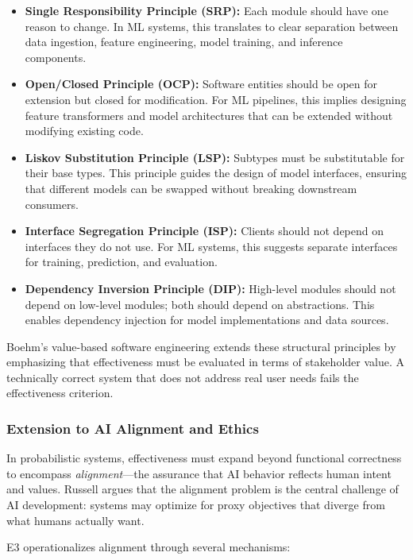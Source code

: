 \documentclass[11pt,a4paper]{article}
\begin{document}
\begin{itemize}[leftmargin=2em]
    \item \textbf{Single Responsibility Principle (SRP):} Each module should have one reason to change. In ML systems, this translates to clear separation between data ingestion, feature engineering, model training, and inference components.
    \item \textbf{Open/Closed Principle (OCP):} Software entities should be open for extension but closed for modification. For ML pipelines, this implies designing feature transformers and model architectures that can be extended without modifying existing code.
    \item \textbf{Liskov Substitution Principle (LSP):} Subtypes must be substitutable for their base types. This principle guides the design of model interfaces, ensuring that different models can be swapped without breaking downstream consumers.
    \item \textbf{Interface Segregation Principle (ISP):} Clients should not depend on interfaces they do not use. For ML systems, this suggests separate interfaces for training, prediction, and evaluation.
    \item \textbf{Dependency Inversion Principle (DIP):} High-level modules should not depend on low-level modules; both should depend on abstractions. This enables dependency injection for model implementations and data sources.
\end{itemize}

Boehm's value-based software engineering \cite{boehm2006value} extends these structural principles by emphasizing that effectiveness must be evaluated in terms of stakeholder value. A technically correct system that does not address real user needs fails the effectiveness criterion.

\subsubsection{Extension to AI Alignment and Ethics}

In probabilistic systems, effectiveness must expand beyond functional correctness to encompass \emph{alignment}---the assurance that AI behavior reflects human intent and values. Russell \cite{russell2019human} argues that the alignment problem is the central challenge of AI development: systems may optimize for proxy objectives that diverge from what humans actually want.

E3 operationalizes alignment through several mechanisms:
\end{document}

